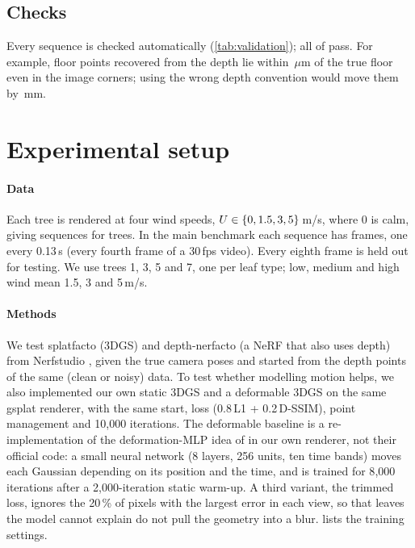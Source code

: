 \documentclass[preprint,11pt,authoryear]{elsarticle}
\begin{document}
\subsection{Checks}
Every sequence is checked automatically (\cref{tab:validation}); all \NSeqPassed{} of \NSeqValidated{} pass. For example, floor points recovered from the depth lie within \ValGroundUm\,$\mu$m of the true floor even in the image corners; using the wrong depth convention would move them by \ValRayMm\,mm.

\begin{table}[!tbp]
\centering\small
\caption{Automatic checks on all sequences.}
\label{tab:validation}
\resizebox{\linewidth}{!}{}
\end{table}

\section{Experimental setup}\label{sec:protocol}
\paragraph{Data} Each tree is rendered at four wind speeds, $U \in \{0, 1.5, 3, 5\}$\,m/s, where 0 is calm, giving \NSeq{} sequences for \NTrees{} trees. In the main benchmark each sequence has \NFrames{} frames, one every 0.13\,s (every fourth frame of a 30\,fps video). Every eighth frame is held out for testing. We use trees 1, 3, 5 and 7, one per leaf type; low, medium and high wind mean 1.5, 3 and 5\,m/s.

\paragraph{Methods} We test splatfacto (3DGS) and depth-nerfacto (a NeRF that also uses depth) from Nerfstudio \citep{tancik2023nerfstudio}, given the true camera poses and started from the depth points of the same (clean or noisy) data. To test whether modelling motion helps, we also implemented our own static 3DGS and a deformable 3DGS on the same gsplat renderer, with the same start, loss (0.8\,L1 + 0.2\,D-SSIM), point management and 10{,}000 iterations. The deformable baseline is a re-implementation of the deformation-MLP idea of \citet{yang2024deformable} in our own renderer, not their official code: a small neural network (8 layers, 256 units, ten time bands) moves each Gaussian depending on its position and the time, and is trained for 8{,}000 iterations after a 2{,}000-iteration static warm-up. A third variant, the trimmed loss, ignores the 20\,\% of pixels with the largest error in each view, so that leaves the model cannot explain do not pull the geometry into a blur.  lists the training settings.
\end{document}

